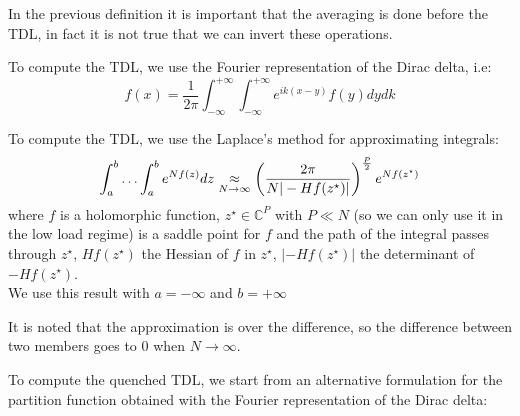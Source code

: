 In the previous definition it is important that the averaging is done before the TDL, in fact it is not true that we can invert these operations.\\
\begin{remark}
    To compute the TDL, we use the Fourier representation of the Dirac delta, i.e:
    \[
    f(x) =\frac{1}{2\pi} \int_{-\infty}^{+\infty} \int_{-\infty}^{+\infty} e^{ik(x-y)} f(y) dy dk
    \]
\end{remark}
\begin{remark}
    To compute the TDL, we use the Laplace's method for approximating integrals:
    \[
    \int_a^b \ldots \int_a^b e^{Nf(z)} dz \underset{N\to\infty}{\approx} \left(\frac{2\pi}{N|-Hf(z^\star)|} \right)^{\frac{P}{2} }e^{Nf(z^\star)}
    \]
    where $f$ is a holomorphic function, $z^\star \in \mathbb{C}^P$ with $P\ll N $ (so we can only use it in the low load regime) is a saddle point for $f$ and the path of the integral passes through $z^\star$, $Hf\left(z^\star\right)$ the Hessian of $f$ in $z^\star$, $\left|-Hf\left(z^\star\right)\right|$ the determinant of $-Hf\left(z^\star\right)$.  \\
    We use this result with $a= -\infty$ and $b=+\infty$

    \noindent It is noted that the approximation is over the difference, so the difference between two members goes to $0$ when $N\to\infty$.
\end{remark}
To compute the quenched TDL, we start from an alternative formulation for the partition function obtained with the Fourier representation of the Dirac delta:
